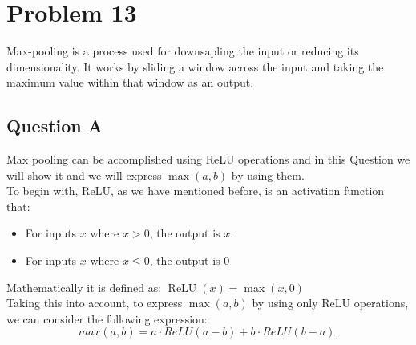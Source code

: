 \section{Problem 13}
Max-pooling is a process used for downsapling the input or reducing its dimensionality. It works by sliding a window across the input and taking the maximum value within that window as an output.

\subsection{Question A}
Max pooling can be accomplished using ReLU operations and in this Question we will show it and we will express $\max(a,b)$ by using them.\\

To begin with, ReLU, as we have mentioned before, is an activation function that:
\begin{itemize}
	\item For inputs $x$ where $x > 0$, the output is $x$.
	\item For inputs $x$ where $x \leq 0$, the output is $0$
\end{itemize}

Mathematically it is defined as: $\operatorname{ReLU}(x)=\operatorname*{max}(x,0)$\\

Taking this into account, to express $\max(a,b)$ by using only ReLU operations, we can consider the following expression:\\
\begin{equation}
	max(a,b) = a \cdot ReLU(a-b) + b \cdot ReLU(b-a).
	\label{eq:problem13}
\end{equation}


